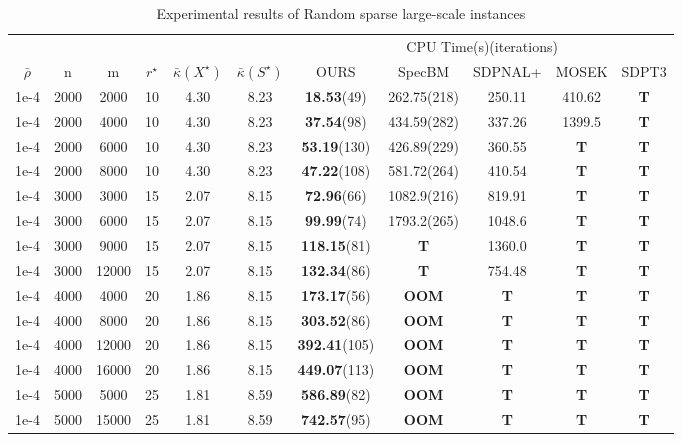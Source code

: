 \documentclass{jcmlatex}
\begin{document}
\begin{table}
    \centering
    \caption{Experimental results of Random sparse large-scale instances}
    \label{t5}
    \setlength\tabcolsep{0.9pt}
    \begin{tabular*}{\textwidth}{@{\extracolsep\fill}ccccccccccc}
\toprule  
~&~&~&~&~&~& \multicolumn{5}{c}{CPU Time(s)(iterations)}  \\ 
\cmidrule{7-11}
\(\bar{\rho}\) & n &m& \(r^{\star}\) &\(\bar{\kappa}(X^{\star})\)&\(\bar{\kappa}(S^{\star})\)& OURS & SpecBM &SDPNAL+& MOSEK&SDPT3\\ 
\midrule 
    1e-4 & 2000&2000 &10&4.30 &8.23 &\textbf{18.53}(49) &262.75(218) &250.11 &410.62&\textbf{T}\\ 
    1e-4 & 2000&4000 &10&4.30 &8.23 &\textbf{37.54}(98) &434.59(282)  &337.26 &1399.5&\textbf{T}\\
    1e-4 & 2000&6000 &10&4.30 &8.23 &\textbf{53.19}(130) &426.89(229) &360.55 &\textbf{T} &\textbf{T} \\
    1e-4 & 2000&8000 &10&4.30 &8.23 &\textbf{47.22}(108) &581.72(264) &410.54 &\textbf{T} &\textbf{T} \\
\midrule 
    1e-4 & 3000&3000 &15&2.07 &8.15  &\textbf{72.96}(66) &1082.9(216)  &819.91 &\textbf{T}&\textbf{T}\\  
    1e-4 & 3000&6000 &15&2.07 &8.15  &\textbf{99.99}(74) &1793.2(265)  &1048.6 &\textbf{T}&\textbf{T}\\ 
    1e-4 & 3000&9000 &15&2.07 &8.15  &\textbf{118.15}(81) &\textbf{T} &1360.0 &\textbf{T} &\textbf{T} \\
    1e-4 & 3000&12000 &15&2.07 &8.15  &\textbf{132.34}(86) &\textbf{T} &754.48 &\textbf{T} &\textbf{T} \\
\midrule 
    1e-4 & 4000&4000 &20&1.86 &8.15  &\textbf{173.17}(56) &\textbf{OOM}  &\textbf{T} &\textbf{T}&\textbf{T}\\
    1e-4 & 4000&8000 &20&1.86 &8.15  &\textbf{303.52}(86) &\textbf{OOM}  &\textbf{T} &\textbf{T}&\textbf{T}\\
    1e-4 & 4000&12000 &20&1.86 &8.15  &\textbf{392.41}(105) &\textbf{OOM} &\textbf{T} &\textbf{T} &\textbf{T} \\
    1e-4 & 4000&16000 &20&1.86 &8.15  &\textbf{449.07}(113) &\textbf{OOM} &\textbf{T} &\textbf{T} &\textbf{T} \\
\midrule 
    1e-4 & 5000&5000 &25&1.81 &8.59  &\textbf{586.89}(82) &\textbf{OOM} &\textbf{T} &\textbf{T} &\textbf{T} \\
    1e-4 & 5000&15000 &25&1.81 &8.59  &\textbf{742.57}(95) &\textbf{OOM} &\textbf{T} &\textbf{T} &\textbf{T} \\

\end{tabular*}
\end{table}
\end{document}
